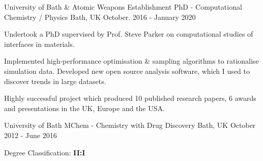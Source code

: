 \begin{cventries}
  \cventry
    {University of Bath \& Atomic Weapons Establishment}
    {PhD - Computational Chemistry / Physics}
    {Bath, UK}
    {October. 2016 - January 2020}
    {
      \begin{cvitems}
        \item {Undertook a PhD supervised by Prof. Steve Parker on computational studies of interfaces in materials.}
        \item {Implemented high-performance optimisation \& sampling algorithms to rationalise simulation data. Developed new open source analysis software, which I used to discover trends in large datasets.}
        \item {Highly successful project which produced 10 published research papers, 6 awards and presentations in the UK, Europe and the USA.}
      \end{cvitems}
    }
\end{cventries}

\begin{cventries}
  \cventry
    {University of Bath}
    {MChem - Chemistry with Drug Discovery}
    {Bath, UK}
    {October 2012 - June 2016}
    {
      \begin{cvitems}
        \item {Degree Classification: \textbf{II:I}}
      \end{cvitems}
    }
\end{cventries}
